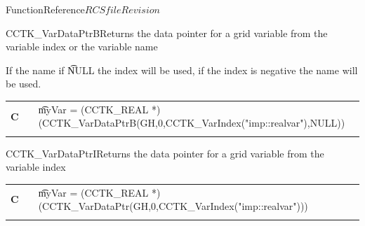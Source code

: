 \begin{cactuspart}{FunctionReference}{$RCSfile$}{$Revision$}
\begin{CCTKFunc}{CCTK\_VarDataPtrB}{Returns the data pointer for a grid variable from the variable index or the variable name}
\label{CCTK-VarDataPtrB}
\showcargs
\begin{params}
\end{params}
\begin{discussion}
If the name if {\t NULL} the index will be used, if the index is negative the name will be used.
\end{discussion}
\begin{examples}
\begin{tabular}{@{}p{3cm}cp{11cm}}
\hfill {\bf C} && {\t myVar = (CCTK\_REAL *)(CCTK\_VarDataPtrB(GH,0,CCTK\_VarIndex("imp::realvar"),NULL))}\\
\\
\end{tabular}
\end{examples}
\begin{errorcodes}
\end{errorcodes}
\end{CCTKFunc}


\begin{CCTKFunc}{CCTK\_VarDataPtrI}{Returns the data pointer for a grid variable from the variable index}
\label{CCTK-VarDataPtrI}
\showcargs
\begin{params}
\end{params}
\begin{discussion}
\end{discussion}
\begin{examples}
\begin{tabular}{@{}p{3cm}cp{11cm}}
\hfill {\bf C} && {\t myVar = (CCTK\_REAL *)(CCTK\_VarDataPtr(GH,0,CCTK\_VarIndex("imp::realvar")))}\\
\\
\end{tabular}
\end{examples}
\begin{errorcodes}
\end{errorcodes}
\end{CCTKFunc}



\end{cactuspart}

